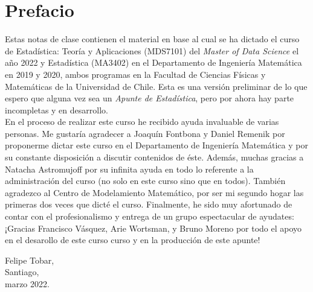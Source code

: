 


\section*{Prefacio}
Estas notas de clase contienen el material en base al cual se ha dictado el curso de Estadística: Teoría y Aplicaciones (MDS7101) del \emph{Master of Data Science} el año 2022 y Estadística (MA3402) en el Departamento de Ingeniería Matemática en 2019 y 2020, ambos programas en la Facultad de Ciencias Físicas y Matemáticas de la Universidad de Chile. Esta es una versión preliminar de lo que espero que alguna vez sea un \emph{Apunte de Estadística}, pero por ahora hay parte incompletas y en desarrollo.\\

En el proceso de realizar este curso he recibido ayuda invaluable de varias personas. Me gustaría agradecer a Joaquín Fontbona y Daniel Remenik por proponerme dictar este curso en el Departamento de Ingeniería Matemática y por su constante disposición a discutir contenidos de éste. Además, muchas gracias a Natacha Astromujoff por su infinita ayuda en todo lo referente a la administración del curso (no solo en este curso sino que en todos). También agradezco al Centro de Modelamiento Matemático, por ser mi segundo hogar las primeras dos veces que dicté el curso. Finalmente, he sido muy afortunado de contar con el profesionalismo y entrega de un grupo espectacular de ayudates: ¡Gracias Francisco Vásquez, Arie Wortsman, y Bruno Moreno por todo el apoyo en el desarollo de este curso curso y en la producción de este apunte!


\vspace{3em}
\noindent Felipe Tobar, \\
Santiago, \\
marzo 2022. 